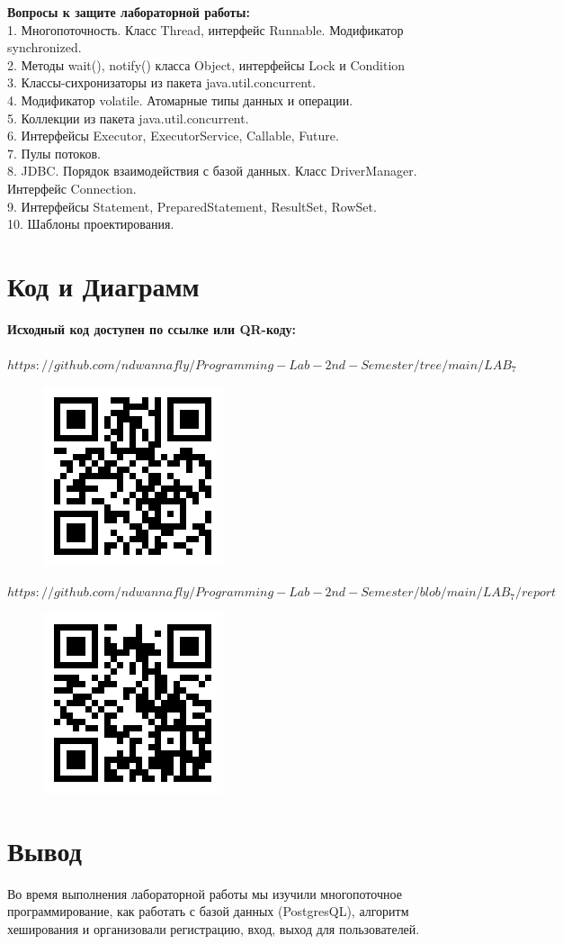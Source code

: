 \textbf{Вопросы к защите лабораторной работы:}\\
	1. Многопоточность. Класс Thread, интерфейс Runnable. Модификатор synchronized.\\
	2. Методы wait(), notify() класса Object, интерфейсы Lock и Condition\\
	3. Классы-сихронизаторы из пакета java.util.concurrent.\\
	4. Модификатор volatile. Атомарные типы данных и операции.\\
	5. Коллекции из пакета java.util.concurrent.\\
	6. Интерфейсы Executor, ExecutorService, Callable, Future.\\
	7. Пулы потоков.\\
	8. JDBC. Порядок взаимодействия с базой данных. Класс DriverManager. Интерфейс Connection.\\
	9. Интерфейсы Statement, PreparedStatement, ResultSet, RowSet.\\
	10. Шаблоны проектирования.\\

\newpage
\section{Код и Диаграмм}
\textbf{Исходный код доступен по ссылке или QR-коду:}\\
\\     
\underline{$https://github.com/ndwannafly/Programming-Lab-2nd-Semester/tree/main/LAB_7$}\\


\begin{figure}[H]
\includegraphics[scale=0.8]{img/SourceCode}
\label{pic:SourceCode}
\end{figure}

\underline{$https://github.com/ndwannafly/Programming-Lab-2nd-Semester/blob/main/LAB_7/report$}\\


\begin{figure}[H]
\includegraphics[scale=0.8]{img/QRDiagram}
\label{pic:QRDiagram}
\end{figure}

\section{Вывод}
Во время выполнения лабораторной работы мы изучили многопоточное программирование, как работать с базой данных (PostgresQL), алгоритм хеширования и организовали регистрацию, вход, выход для пользователей.